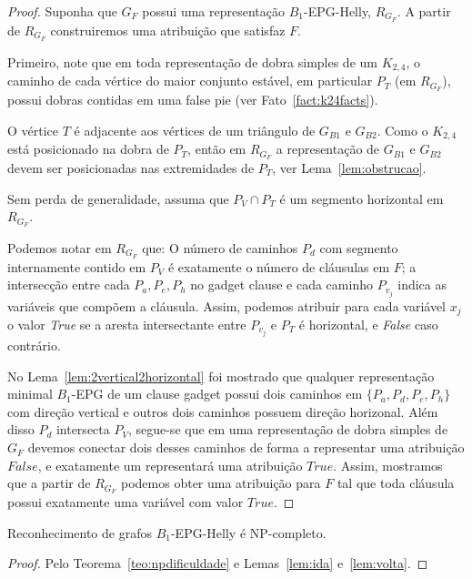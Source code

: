 \begin{proof}
Suponha que $G_F$ possui uma representação $B_1$-EPG-Helly, $R_{G_F}$. A partir de $R_{G_F}$ construiremos uma atribuição que satisfaz $F$. 

Primeiro, note que em toda representação de dobra simples de um $K_{2,4}$, o caminho de cada vértice do maior conjunto estável, em particular $P_{T}$ (em $R_{G_F}$), possui dobras contidas em uma false pie (ver Fato~\ref{fact:k24facts}). 


O vértice  $T$ é adjacente aos vértices de um triângulo de  $G_{B1}$ e $G_{B2}$. Como o $K_{2,4}$ está posicionado na dobra de  $P_{T}$, então em $R_{G_F}$ a representação de $G_{B1}$ e $G_{B2}$ devem ser posicionadas nas extremidades de $P_{T}$, ver Lema~\ref{lem:obstrucao}.   


Sem perda de generalidade, assuma que $P_{V} \cap P_{T}$ é um segmento horizontal em $R_{G_F}$.

Podemos notar em $R_{G_F}$ que: O número de caminhos $P_{d}$ com segmento internamente contido em  $P_{V}$ é exatamente o número de cláusulas em $F$; a intersecção entre cada  $P_{a}, P_{e}, P_{h}$ no  gadget clause e cada caminho $P_{v_j}$ indica as variáveis que compõem a cláusula. Assim, podemos atribuir para cada variável $ x_{j}$ o valor \textit{True} se a aresta intersectante entre $P_{v_j}$ e $P_{T}$ é horizontal, e \textit{False} caso contrário. 


No Lema~\ref{lem:2vertical2horizontal} foi mostrado que qualquer representação minimal $B_1$-EPG de um clause gadget possui dois caminhos em $\{P_{a}, P_{d}, P_{e}, P_{h}\}$ com direção vertical e outros dois caminhos possuem direção horizonal. Além disso $P_{d}$ intersecta $P_{V}$, segue-se que em uma representação de dobra simples de  $G_F$ devemos conectar dois desses caminhos de forma a representar uma atribuição $False$, e exatamente um representará uma atribuição $True$. Assim, mostramos que a partir de $R_{G_F}$ podemos obter uma atribuição para $F$ tal que toda cláusula possui exatamente uma variável com valor $True$.
 \end{proof}

\begin{theorem}
{\sc Reconhecimento de grafos $B_{1}$-EPG-Helly } é NP-completo.
\end{theorem}
\begin{proof}
Pelo Teorema~\ref{teo:npdificuldade} e Lemas~\ref{lem:ida} e~\ref{lem:volta}.
 \end{proof} %

